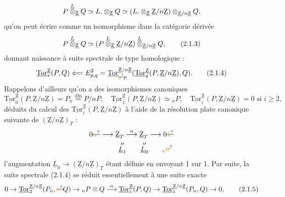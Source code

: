 \[ P\overset{\underline L}{\otimes}_{\underline{\mathrm Z}}Q\simeq L\mathord.\otimes_{\underline{\mathrm Z}}Q\simeq(L\mathord.\otimes_{\underline{\mathrm Z}}\underline{\mathrm Z}/n\underline{\mathrm Z})\otimes_{\underline{\mathrm Z}/n\underline{\mathrm Z}}Q, \]
qu'on peut écrire comme un isomorphisme dans la catégorie dérivée
\[ P\overset{\underline L}{\otimes}_{\underline{\mathrm Z}}Q\simeq(P\overset{\underline L}{\otimes}_{\underline{\mathrm Z}}\underline{\mathrm Z}/n\underline{\mathrm Z})\overset{\underline L}{\otimes}_{\underline{\mathrm Z}/n\underline{\mathrm Z}}Q,\tag*{(2.1.3)} \]
donnant naissance à   suite spectrale de type homologique  : 
\[ \underline{\mathrm{Tor}}^{\underline{\mathrm Z}}_*(P,Q)\handwritten{\Longleftarrow}E^2_{p,q}=\underline{\mathrm{Tor}}^{\underline{\mathrm Z}/n\underline{\mathrm Z}}_{\deleted{\unsure{q}}p}(\underline{\mathrm{Tor}}^{\underline{\mathrm Z}}_q(P,\underline{\mathrm Z}/n\underline{\mathrm Z}),Q).\tag*{(2.1.4)} \]
Rappelons d'ailleurs qu'on a des isomorphismes canoniques
\[ \underline{\mathrm{Tor}}^{\underline{\mathrm Z}}_0(P,\underline{\mathrm Z}/n\underline{\mathrm Z})=P_n\mathrel{\overset{\mathrm{dfn}}{=}}P/nP,\quad \underline{\mathrm{Tor}}^{\underline{\mathrm Z}}_1(P,\underline{\mathrm Z}/n\underline{\mathrm Z})\simeq {}_nP,\quad \underline{\mathrm{Tor}}^{\underline{\mathrm Z}}_i(P,\underline{\mathrm Z}/n\underline{\mathrm Z})=0\text{ si }i\geq2, \]
déduits du calcul des $\underline{\mathrm{Tor}}^{\underline{\mathrm Z}}_i(P,\underline{\mathrm Z}/n\underline{\mathrm Z})$ à l'aide de la résolution plate canonique suivante de $(\underline{\mathrm Z}/n\underline{\mathrm Z})_T$ :
\[ \begin{aligned}0\deleted{\unsure{n}}&\longrightarrow\underline{\mathrm Z}_T\overset{n}{\longrightarrow}\underline{\mathrm Z}_T\longrightarrow 0\deleted{\unsure{1}}\\ &\hspace{2.6em}\overset{\prime\prime}{\underline L_1}\qquad\overset{\prime\prime}{\underline L_0}\qquad,\unsure{\prime\prime}\end{aligned} \]
l'augmentation $\underline L_0\to(\underline{\mathrm Z}/n\underline{\mathrm Z})_T$ étant définie en envoyant 1 sur 1. Par suite, la suite spectrale (2.1.4) se réduit essentiellement à une suite exacte
\[ 0\to\underline{\mathrm{Tor}}^{\underline{\mathrm Z}/n\underline{\mathrm Z}}_2(P_n,\deleted{\unsure{*}}Q)\to{}_nP\otimes Q\mathbin{\overset{\handwritten{\alpha}}{\handwritten{\longrightarrow}}}\underline{\mathrm{Tor}}^{\underline{\mathrm Z}}_1(P,Q)\to\underline{\mathrm{Tor}}^{\underline{\mathrm Z}/n\underline{\mathrm Z}}_1(P_n,Q)\to0,\tag*{(2.1.5)} \]
